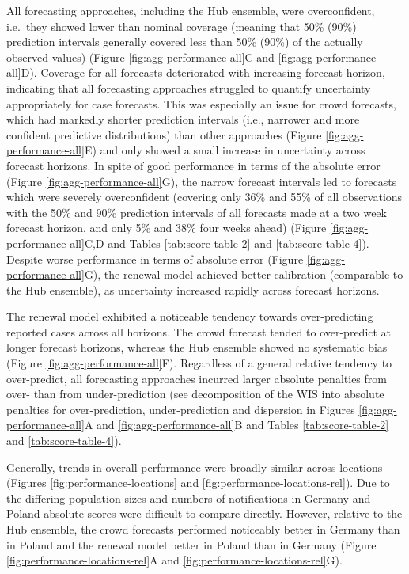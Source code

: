 \documentclass[
]{article}
\begin{document}
All forecasting approaches, including the Hub ensemble, were overconfident, i.e.~they showed lower than nominal coverage (meaning that 50\% (90\%) prediction intervals generally covered less than 50\% (90\%) of the actually observed values) (Figure \ref{fig:agg-performance-all}C and \ref{fig:agg-performance-all}D). Coverage for all forecasts deteriorated with increasing forecast horizon, indicating that all forecasting approaches struggled to quantify uncertainty appropriately for case forecasts. This was especially an issue for crowd forecasts, which had markedly shorter prediction intervals (i.e., narrower and more confident predictive distributions) than other approaches (Figure \ref{fig:agg-performance-all}E) and only showed a small increase in uncertainty across forecast horizons. In spite of good performance in terms of the absolute error (Figure \ref{fig:agg-performance-all}G), the narrow forecast intervals led to forecasts which were severely overconfident (covering only 36\% and 55\% of all observations with the 50\% and 90\% prediction intervals of all forecasts made at a two week forecast horizon, and only 5\% and 38\% four weeks ahead) (Figure \ref{fig:agg-performance-all}C,D and Tables \ref{tab:score-table-2} and \ref{tab:score-table-4}). Despite worse performance in terms of absolute error (Figure \ref{fig:agg-performance-all}G), the renewal model achieved better calibration (comparable to the Hub ensemble), as uncertainty increased rapidly across forecast horizons.

The renewal model exhibited a noticeable tendency towards over-predicting reported cases across all horizons. The crowd forecast tended to over-predict at longer forecast horizons, whereas the Hub ensemble showed no systematic bias (Figure \ref{fig:agg-performance-all}F). Regardless of a general relative tendency to over-predict, all forecasting approaches incurred larger absolute penalties from over- than from under-prediction (see decomposition of the WIS into absolute penalties for over-prediction, under-prediction and dispersion in Figures \ref{fig:agg-performance-all}A and \ref{fig:agg-performance-all}B and Tables \ref{tab:score-table-2} and \ref{tab:score-table-4}).

Generally, trends in overall performance were broadly similar across locations (Figures \ref{fig:performance-locations} and \ref{fig:performance-locations-rel}).
Due to the differing population sizes and numbers of notifications in Germany and Poland absolute scores were difficult to compare directly. However, relative to the Hub ensemble, the crowd forecasts performed noticeably better in Germany than in Poland and the renewal model better in Poland than in Germany (Figure \ref{fig:performance-locations-rel}A and \ref{fig:performance-locations-rel}G).
\end{document}
